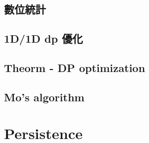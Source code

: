 \subsection{數位統計}

\subsection{1D/1D dp 優化}

\subsection{Theorm - DP optimization}

\subsection{Mo's algorithm}




\section{Persistence}

